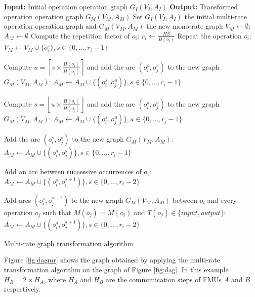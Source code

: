 \begin{algorithm}[htb]
		\textbf{Input:} Initial operation operation graph $G_I(V_I,A_I)$\; 
		\textbf{Output:} Transformed operation operation graph $G_M(V_M,A_M)$\;
		Set $G_I(V_I,A_I)$ the initial multi-rate operation operation graph and $G_M(V_M,A_M)$ the new mono-rate graph\; 
		$V_M \leftarrow \emptyset$; $A_M \leftarrow \emptyset$\;
		{
			Compute the repetition factor of $o_i$: $r_i \leftarrow \frac{HS}{H(o_i)}$\;
			Repeat the operation $o_i$: $V_M \leftarrow V_M \cup \{o_i^s\}, s \in \{0, \dots,r_i-1\}$\;
		}
		{
			{
					Compute $u = \left \lceil{s \times \frac{H(o_i)}{H(o_j)}}\right \rceil$ and add the arc $(o_i^s,o_j^u)$ to the new graph $G_M(V_M,A_M)$: $A_M \leftarrow A_M \cup \{(o_i^s,o_j^u)\}, s \in \{0, \dots,r_i-1\}$\;
				
			}
			{
				
					Compute $s = \left \lfloor{u \times \frac{H(o_i)}{H(o_j)}}\right \rfloor$ and add the arc $(o_i^s,o_j^u)$ to the new graph $G_M(V_M,A_M)$: $A_M \leftarrow A_M \cup \{(o_i^s,o_j^u)\}, u \in \{0, \dots,r_j-1\}$\;
				
			}
			\Else
			{
				
					Add the arc $(o_i^s,o_j^s)$ to the new graph $G_M(V_M,A_M)$: $A_M \leftarrow A_M \cup \{(o_i^s,o_j^s)\}, s \in \{0, \dots,r_i-1\}$\;
				
			}
		}
		{
			
				Add an arc between successive occurrences of $o_i$: $A_M \leftarrow A_M \cup \{(o_i^s,o_i^{s+1})\}, s \in \{0, \dots,r_i-2\}$\;
			
		}
		{
					Add arcs $(o_i^s,o_j^{s+1})$ to the new graph $G_M(V_M,A_M)$ between $o_i$ and every operation $o_j$ such that $M(o_j)=M(o_i)$ and $T(o_j) \in \{input,output\}$: $A_M \leftarrow A_M \cup \{(o_i^s,o_j^{s+1})\}, s \in \{0, \dots,r_i-2\}$\;
				
		}
	\caption{Multi-rate graph transformation algorithm}
	\label{algo:mr}
\end{algorithm}

Figure \ref{fig:dagmr} shows the graph obtained by applying the multi-rate transformation algorithm on the graph of Figure \ref{fig:dag}. In this example $H_B = 2 \times H_A$, where $H_A$ and $H_B$ are the communication steps of FMUs $A$ and $B$ respectively.

